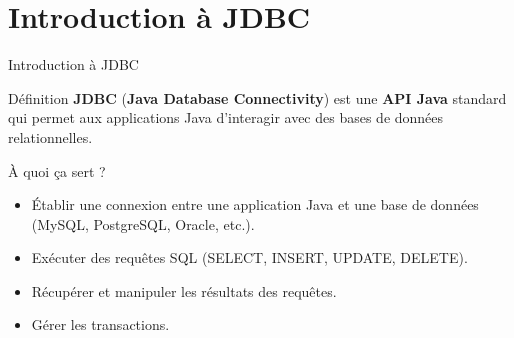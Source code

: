 \documentclass[aspectratio=169,10pt]{beamer}
\begin{document}
\section{Introduction à JDBC}

\begin{frame}{Introduction à JDBC}
    \begin{block}{Définition}
        \textbf{JDBC} (\textbf{Java Database Connectivity}) est une \textbf{API Java} standard qui permet aux applications Java d'interagir avec des bases de données relationnelles.
    \end{block}

    \begin{block}{À quoi ça sert ?}
        \begin{itemize}
            \item Établir une connexion entre une application Java et une base de données (MySQL, PostgreSQL, Oracle, etc.).
            \item Exécuter des requêtes SQL (SELECT, INSERT, UPDATE, DELETE).
            \item Récupérer et manipuler les résultats des requêtes.
            \item Gérer les transactions.
        \end{itemize}
    \end{block}

    
\end{frame}
\end{document}
